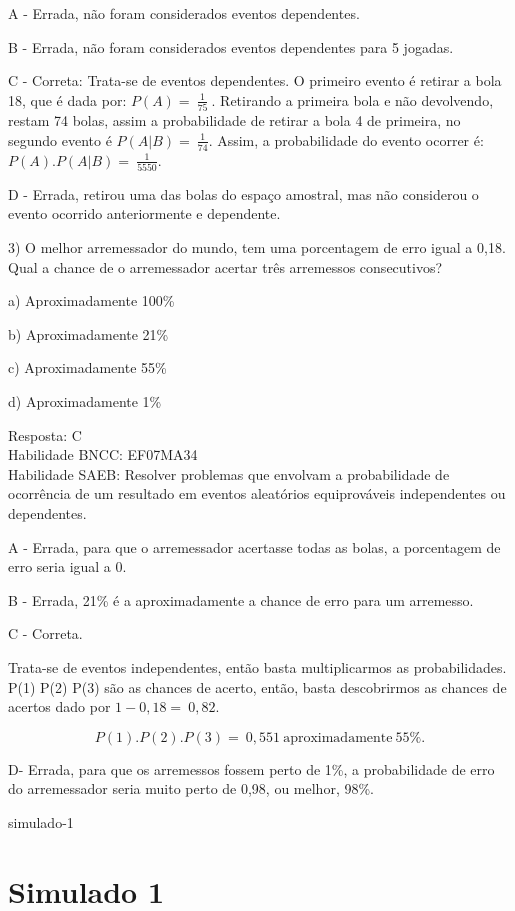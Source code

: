{A - Errada, não foram considerados eventos dependentes.

B - Errada, não foram considerados eventos dependentes para 5 jogadas.

C - Correta: Trata-se de eventos dependentes. O primeiro evento é
retirar a bola 18, que é dada por: \(P(A) = \ \frac{1}{75}\ \).
Retirando a primeira bola e não devolvendo, restam 74 bolas, assim a
probabilidade de retirar a bola 4 de primeira, no segundo evento é
\(P(A|B) = \ \frac{1}{74}\). Assim, a probabilidade do evento ocorrer é:
\(P(A).P(A|B) = \ \frac{1}{5550}\).

D - Errada, retirou uma das bolas do espaço amostral, mas não considerou
o evento ocorrido anteriormente e dependente.

3) O melhor arremessador do mundo, tem uma porcentagem de erro igual a
0,18. Qual a chance de o arremessador acertar três arremessos
consecutivos?

a) Aproximadamente 100\%

b) Aproximadamente 21\%

c) Aproximadamente 55\%

d) Aproximadamente 1\%

Resposta: C\\
Habilidade BNCC: EF07MA34\\
Habilidade SAEB: Resolver problemas que envolvam a probabilidade de
ocorrência de um resultado em eventos aleatórios equiprováveis
independentes ou dependentes.

A - Errada, para que o arremessador acertasse todas as bolas, a
porcentagem de erro seria igual a 0.

B - Errada, 21\% é a aproximadamente a chance de erro para um arremesso.

C - Correta.

Trata-se de eventos independentes, então basta multiplicarmos as
probabilidades. P(1) P(2) P(3) são as chances de acerto, então, basta
descobrirmos as chances de acertos dado por \(1 - 0,18 = \ 0,82.\)

\[P(1).P(2).P(3) = \ 0,551\ \text{aproximadamente}\ 55\%.\]

D- Errada, para que os arremessos fossem perto de 1\%, a probabilidade
de erro do arremessador seria muito perto de 0,98, ou melhor, 98\%.

simulado-1}{%
\section{Simulado 1}

}
